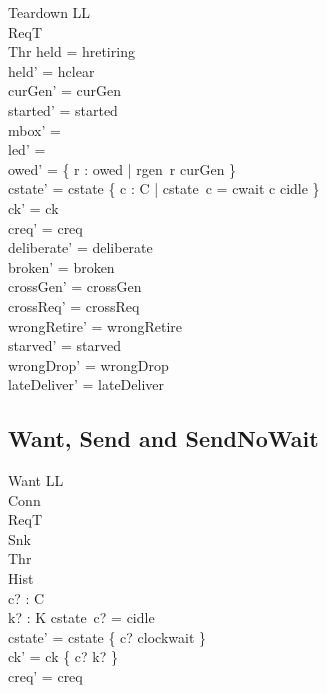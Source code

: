 \documentclass[a4paper,10pt,fleqn]{article}
\begin{document}
\begin{schema}{Teardown}
  \Delta LL \\
  \Xi ReqT \\
  \Xi Thr
\where
  held = hretiring \\
  held' = hclear \\
  curGen' = curGen \\
  started' = started \\
  mbox' = \emptyset \\
  led' = \emptyset \\
  owed' = \{ r : owed | rgen~r \neq curGen \} \\
  cstate' = cstate \oplus \{ c : C | cstate~c = cwait \spot c \mapsto cidle \} \\
  ck' = ck \\
  creq' = creq \\
  deliberate' = deliberate \\
  broken' = broken \\
  crossGen' = crossGen \\
  crossReq' = crossReq \\
  wrongRetire' = wrongRetire \\
  starved' = starved \\
  wrongDrop' = wrongDrop \\
  lateDeliver' = lateDeliver
\end{schema}

\subsection{Want, Send and SendNoWait}

\begin{schema}{Want}
  \Delta LL \\
  \Xi Conn \\
  \Xi ReqT \\
  \Xi Snk \\
  \Xi Thr \\
  \Xi Hist \\
  c? : C \\
  k? : K
\where
  cstate~c? = cidle \\
  cstate' = cstate \oplus \{ c? \mapsto clockwait \} \\
  ck' = ck \oplus \{ c? \mapsto k? \} \\
  creq' = creq
\end{schema}
\end{document}
